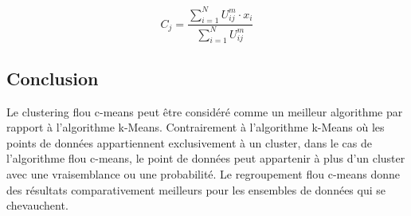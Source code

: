 \begin{equation}
    C_{j} = \frac{\sum_{i = 1}^{N} U_{ij}^{m} \cdot x_{i}}{ \sum_{i=1}^{N} U_{ij}^{m}}
\end{equation}

\begin{figure}[!h]
    \centering
    \qquad
\end{figure}

\subsection{Conclusion}
Le clustering flou c-means peut être considéré comme un meilleur algorithme par rapport à l'algorithme k-Means. Contrairement à l'algorithme k-Means où les points de données appartiennent exclusivement à un cluster, dans le cas de l'algorithme flou c-means, le point de données peut appartenir à plus d'un cluster avec une vraisemblance ou une probabilité. Le regroupement flou c-means donne des résultats comparativement meilleurs pour les ensembles de données qui se chevauchent.

